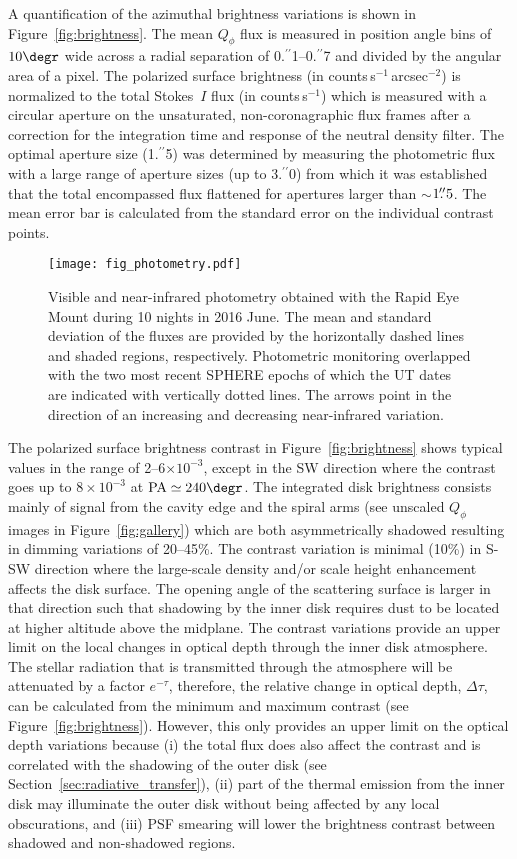 \documentclass[twocolumn,tighten]{aastex61}
\newcommand{\ffarcs}{\mbox{\ensuremath{.\!\!^{\prime\prime}}}}
\begin{document}
A quantification of the azimuthal brightness variations is shown in Figure~\ref{fig:brightness}. The mean $Q_\phi$ flux is measured in position angle bins of $10\degr$ wide across a radial separation of 0\ffarcs1--0\ffarcs7 and divided by the angular area of a pixel. The polarized surface brightness (in counts\,s$^{-1}$\,arcsec$^{-2}$) is normalized to the total Stokes~$I$ flux (in counts\,s$^{-1}$) which is measured with a circular aperture on the unsaturated, non-coronagraphic flux frames after a correction for the integration time and response of the neutral density filter. The optimal aperture size (1\ffarcs5) was determined by measuring the photometric flux with a large range of aperture sizes (up to 3\ffarcs0) from which it was established that the total encompassed flux flattened for apertures larger than $\sim$$1\ffarcs5$. The mean error bar is calculated from the standard error on the individual contrast points.

\begin{figure*}
\centering
\texttt{[image: fig\_photometry.pdf]}
\caption{Visible and near-infrared photometry obtained with the Rapid Eye Mount during 10 nights in 2016 June. The mean and standard deviation of the fluxes are provided by the horizontally dashed lines and shaded regions, respectively. Photometric monitoring overlapped with the two most recent SPHERE epochs of which the UT dates are indicated with vertically dotted lines. The arrows point in the direction of an increasing and decreasing near-infrared variation.\label{fig:photometry}}
\end{figure*}

The polarized surface brightness contrast in Figure~\ref{fig:brightness} shows typical values in the range of 2--6$\times 10^{-3}$, except in the SW direction where the contrast goes up to $8 \times 10^{-3}$ at ${\rm PA}\simeq240\degr$. The integrated disk brightness consists mainly of signal from the cavity edge and the spiral arms (see unscaled $Q_\phi$ images in Figure~\ref{fig:gallery}) which are both asymmetrically shadowed resulting in dimming variations of 20--45\%. The contrast variation is minimal (10\%) in S-SW direction where the large-scale density and/or scale height enhancement affects the disk surface. The opening angle of the scattering surface is larger in that direction such that shadowing by the inner disk requires dust to be located at higher altitude above the midplane. The contrast variations provide an upper limit on the local changes in optical depth through the inner disk atmosphere. The stellar radiation that is transmitted through the atmosphere will be attenuated by a factor $e^{-\tau}$, therefore, the relative change in optical depth, $\Delta\tau$, can be calculated from the minimum and maximum contrast (see Figure~\ref{fig:brightness}). However, this only provides an upper limit on the optical depth variations because (i) the total flux does also affect the contrast and is correlated with the shadowing of the outer disk (see Section~\ref{sec:radiative_transfer}), (ii) part of the thermal emission from the inner disk may illuminate the outer disk without being affected by any local obscurations, and (iii) PSF smearing will lower the brightness contrast between shadowed and non-shadowed regions.
\end{document}
